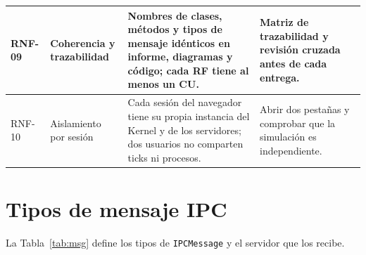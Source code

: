 \documentclass[conference]{IEEEtran}
\begin{document}
\begin{table}[!t]
\begin{tabular}{|>{\raggedright\arraybackslash}p{1.2cm}|>{\raggedright\arraybackslash}p{3.0cm}|>{\raggedright\arraybackslash}p{8.2cm}|>{\raggedright\arraybackslash}p{4.6cm}|}
RNF-09 & Coherencia y trazabilidad & Nombres de clases, métodos y tipos de mensaje idénticos en informe, diagramas y código; cada RF tiene al menos un CU. & Matriz de trazabilidad y revisión cruzada antes de cada entrega.\\ \hline
RNF-10 & Aislamiento por sesión & Cada sesión del navegador tiene su propia instancia del Kernel y de los servidores; dos usuarios no comparten ticks ni procesos. & Abrir dos pestañas y comprobar que la simulación es independiente.\\ \hline
\end{tabular}
\end{table}

\section{Tipos de mensaje IPC}\label{ax:msg}
La Tabla~\ref{tab:msg} define los tipos de \texttt{IPCMessage} y el servidor que los recibe.
\end{document}
